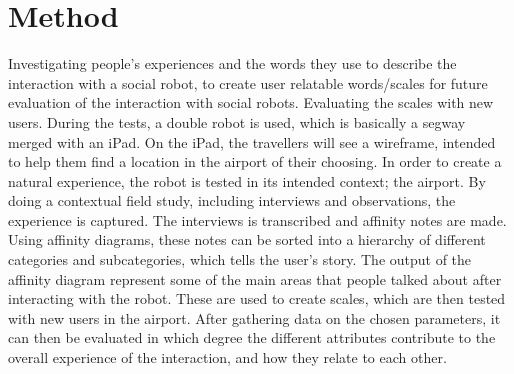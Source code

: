 \section{Method}
\label{Method}

Investigating people's experiences and the words they use to describe the interaction with a social robot, to create user relatable words/scales for future evaluation of the interaction with social robots. Evaluating the scales with new users.
During the tests, a double robot is used, which is basically a segway merged with an iPad. On the iPad, the travellers will see a wireframe, intended to help them find a location in the airport of their choosing.
In order to create a natural experience, the robot is tested in its intended context; the airport. By doing a contextual field study, including interviews and observations, the experience is captured. The interviews is transcribed and affinity notes are made. Using affinity diagrams, these notes can be sorted into a hierarchy of different categories and subcategories, which tells the user’s story.
The output of the affinity diagram represent some of the main areas that people talked about after interacting with the robot. These are used to create scales, which are then tested with new users in the airport. After gathering data on the chosen parameters, it can then be evaluated in which degree the different attributes contribute to the overall experience of the interaction, and how they relate to each other.

